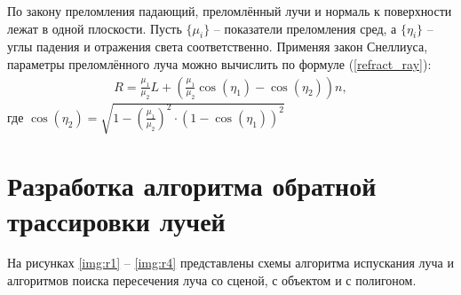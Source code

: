 По закону преломления падающий, преломлённый лучи и нормаль к поверхности лежат в одной плоскости. 
Пусть $\{\mu_i\}$ -- показатели преломления сред, а $\{\eta_i\}$ – углы падения и отражения света соответственно. 
Применяя закон Снеллиуса, параметры преломлённого луча можно вычислить по формуле (\ref{refract_ray}):
\begin{equation}
\label{refract_ray}
\begin{aligned}
R = \frac{\mu_1}{\mu_2} L + ( \frac{\mu_1}{\mu_2} \cos(\eta_1) - \cos(\eta_2))n ,
\end{aligned}
\end{equation} 
где $\cos(\eta_2) = \sqrt{1 - (\frac{\mu_1}{\mu_2})^2 \cdot (1 - \cos(\eta_1))^2}$

\section{Разработка алгоритма обратной трассировки лучей}

На рисунках \ref{img:r1} -- \ref{img:r4} представлены схемы алгоритма испускания луча и алгоритмов поиска пересечения луча со сценой, с объектом и с полигоном.

